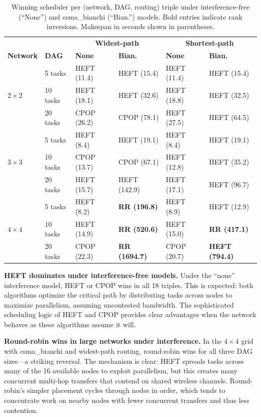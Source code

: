 \documentclass[conference]{IEEEtran}
\begin{document}
\begin{table}[t]
\centering
\caption{Winning scheduler per (network, DAG, routing) triple under
  interference-free (``None'') and csma\_bianchi (``Bian.'') models.
  Bold entries indicate rank inversions.  Makespan in seconds shown
  in parentheses.}
\label{tab:winner_matrix}
\begin{tabular}{@{}ll|ll|ll@{}}
\toprule
& & \multicolumn{2}{c|}{\textbf{Widest-path}} &
  \multicolumn{2}{c}{\textbf{Shortest-path}} \\
\textbf{Network} & \textbf{DAG} &
  \textbf{None} & \textbf{Bian.} &
  \textbf{None} & \textbf{Bian.} \\
\midrule
\multirow{3}{*}{$2\times2$}
  & 5 tasks  & HEFT (11.4)  & HEFT (15.4)   & HEFT (11.4) & HEFT (15.4) \\
  & 10 tasks & HEFT (18.1)  & HEFT (32.6)   & HEFT (18.8) & HEFT (32.5) \\
  & 20 tasks & CPOP (26.2)  & CPOP (78.1)   & HEFT (27.5) & HEFT (64.5) \\
\midrule
\multirow{3}{*}{$3\times3$}
  & 5 tasks  & HEFT (8.4)   & HEFT (19.1)   & HEFT (8.4) & HEFT (19.1) \\
  & 10 tasks & CPOP (13.7)  & CPOP (67.1)   & HEFT (12.8) & HEFT (35.2) \\
  & 20 tasks & HEFT (15.7)  & HEFT (142.9)  & HEFT (17.1) & HEFT (96.7) \\
\midrule
\multirow{3}{*}{$4\times4$}
  & 5 tasks  & HEFT (8.2)   & \textbf{RR (196.8)} & HEFT (8.9) & HEFT (12.9) \\
  & 10 tasks & HEFT (14.9)  & \textbf{RR (520.6)} & HEFT (15.0) & \textbf{RR (417.1)} \\
  & 20 tasks & CPOP (22.3)  & \textbf{RR (1694.7)} & CPOP (20.7) & \textbf{HEFT (794.4)} \\
\bottomrule
\end{tabular}
\end{table}

\textbf{HEFT dominates under interference-free models.}  Under the
``none'' interference model, HEFT or CPOP wins in all 18 triples.  This
is expected: both algorithms optimize the critical path by distributing
tasks across nodes to maximize parallelism, assuming uncontested bandwidth.
The sophisticated scheduling logic of HEFT and CPOP provides clear
advantages when the network behaves as these algorithms assume it will.

\textbf{Round-robin wins in large networks under interference.}
In the $4\times4$ grid with csma\_bianchi and widest-path routing,
round-robin wins for all three DAG sizes---a striking reversal.  The
mechanism is clear: HEFT spreads tasks across many of the 16 available
nodes to exploit parallelism, but this creates many concurrent multi-hop
transfers that contend on shared wireless channels.  Round-robin's simpler
placement cycles through nodes in order, which tends to concentrate work
on nearby nodes with fewer concurrent transfers and thus less contention.
\end{document}
